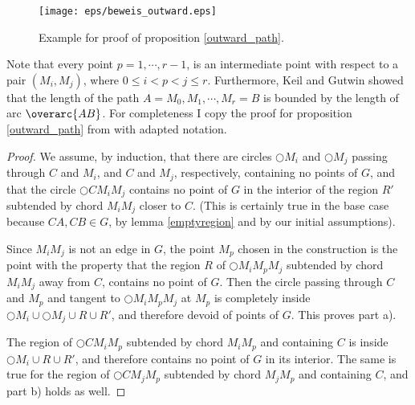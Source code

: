 \begin{figure}[h!]
\centering
\texttt{[image: eps/beweis\_outward.eps]}
\caption{Example for proof of proposition \ref{outward_path}.}
\label{fig:outward_path_beweis}
\end{figure}

Note that every point $p=1, \cdots, r-1 $, is an intermediate point with respect to a pair $(M_i, M_j) $, where $0\leq i < p <j \leq r  $.
Furthermore, Keil and Gutwin \cite{keil} showed that the length of the path $A =M_0, M_1, \cdots, M_r=B $ is bounded by the length of arc $\overarc{AB} $.
For completeness I copy the proof for proposition \ref{outward_path} from \cite{kanj} with adapted notation.
\begin{proof}

We assume, by induction, that there are circles $\bigcirc{M_i} $ and $\bigcirc{M_j} $ passing through $C $ and $M_i $, and $C $ and $M_j $, respectively, containing no points of $G $, and that the circle $\bigcirc{CM_iM_j} $ contains no point of $G $ in the interior of the region $R' $ subtended by chord $M_iM_j $ closer to $C $.
(This is certainly true in the base case because $CA, CB \in G $, by lemma \ref{emptyregion} and by our initial assumptions).

Since $M_iM_j $ is not an edge in $G $, the point $M_p $ chosen in the construction is the point with the property that the region $R $ of $\bigcirc{M_iM_pM_j} $ subtended by chord $M_iM_j $ away from $C $, contains no point of $G $. 
Then the circle passing through $C $ and $M_p $ and tangent to $\bigcirc{M_iM_pM_j} $ at $M_p $ is completely inside $\bigcirc{M_i} \cup \bigcirc{M_j} \cup R \cup R' $, and therefore devoid of points of $G $.
This proves part a).

The region of $\bigcirc{CM_iM_p} $ subtended by chord $M_iM_p $ and containing $C $ is inside $ \bigcirc{M_i} \cup R \cup R' $, and therefore contains no point of $G $ in its interior.
The same is true for the region of $\bigcirc{CM_jM_p} $ subtended by chord $M_jM_p $ and containing $C $, and part b) holds as well.



\end{proof}

